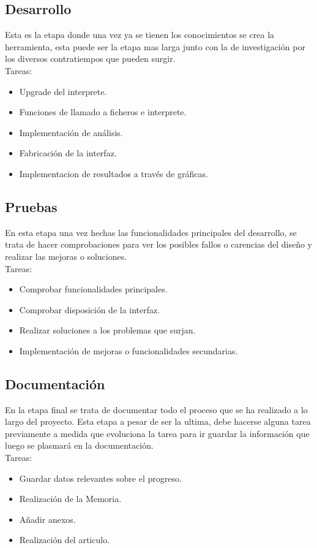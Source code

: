 \subsection{Desarrollo}
Esta es la etapa donde una vez ya se tienen los conocimientos se crea la herramienta, esta puede ser la etapa mas larga junto con la de investigación por los diversos contratiempos que pueden surgir.\\

Tareas:
\begin{itemize}
	\item Upgrade del interprete.
	\item Funciones de llamado a ficheros e interprete.
	\item Implementación de análisis.
	\item Fabricación de la interfaz.
	\item Implementacion de resultados a través de gráficas.
\end{itemize}

\subsection{Pruebas}
En esta etapa una vez hechas las funcionalidades principales del desarrollo, se trata de hacer comprobaciones para ver los posibles fallos o carencias del diseño y realizar las mejoras o soluciones.\\

Tareas:
\begin{itemize}
	\item Comprobar funcionalidades  principales.
	\item Comprobar disposición de la interfaz.
	\item Realizar soluciones a los problemas que surjan.
	\item Implementación de mejoras o funcionalidades secundarias.
\end{itemize}

\subsection{Documentación}
En la etapa final se trata de documentar todo el proceso que se ha realizado a lo largo del proyecto. Esta etapa a pesar de ser la ultima, debe hacerse alguna tarea previamente a medida que evoluciona la tarea para ir guardar la información que luego se plasmará en la documentación.\\

Tareas:
\begin{itemize}
	\item Guardar datos relevantes sobre el progreso.
	\item Realización de la Memoria.
	\item Añadir anexos.
	\item Realización del articulo.
\end{itemize}

